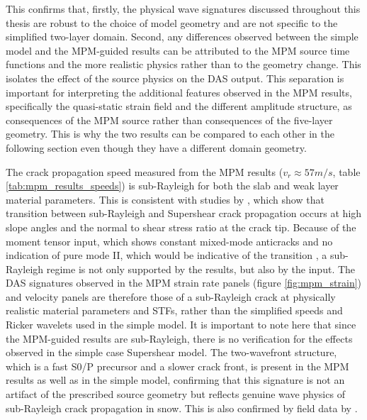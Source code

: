 This confirms that, firstly, the physical wave signatures discussed
throughout this thesis are robust to the choice of model geometry and
are not specific to the simplified two-layer domain. Second, any
differences observed between the simple model and the MPM-guided results
can be attributed to the MPM source time functions and the more realistic physics rather than to the geometry change. This isolates the effect of the source physics on the DAS output. This separation is important for interpreting the additional features observed in the MPM results, specifically the quasi-static strain field and the different amplitude structure, as consequences of the MPM source rather than consequences of the five-layer geometry. This is why the two results can be compared to each other in the following section even though they have a different domain geometry. \par


The crack propagation speed measured from the MPM results
($v_r \approx 57m/s$, table \ref{tab:mpm_results_speeds}) is
sub-Rayleigh for both the slab and weak layer material parameters. This is consistent with studies by \cite{trottetTransitionSubRayleighAnticrack2022,sironTheoreticalFrameworkDynamic2023,bergfeldSignaturesSubRayleighSupershear2025}, which show that transition between sub-Rayleigh and Supershear crack propagation occurs at high slope angles and the normal to shear stress ratio at the crack tip. Because of the moment tensor input, which shows constant mixed-mode anticracks and no indication of pure mode II, which would be indicative of the transition \parencite{trottetTransitionSubRayleighAnticrack2022}, a sub-Rayleigh regime is not only supported by the results, but also by the input. 
The DAS signatures observed in the MPM strain rate panels
(figure \ref{fig:mpm_strain}) and velocity panels are therefore those of a sub-Rayleigh crack at physically realistic material parameters and STFs, rather than the simplified speeds and Ricker wavelets used in the simple model. It is important to note here that since the MPM-guided results are sub-Rayleigh, there is no verification for the effects observed in the simple case Supershear model. The two-wavefront structure, which is a fast S0/P precursor and a slower crack front, is present in the MPM results as well as in the simple model, confirming that this signature is not an artifact of the prescribed source geometry but reflects genuine wave physics of sub-Rayleigh crack propagation in snow. This is also confirmed by field data by \cite{herwijnenSeismicSensorArray2011}. \par


